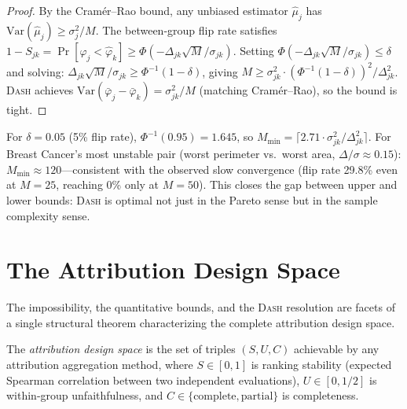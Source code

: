 \documentclass{jmlr}
\newcommand{\Var}{\mathrm{Var}}
\newcommand{\DASH}{\textsc{Dash}}
\begin{document}
\begin{proof}
By the Cram\'er--Rao bound, any unbiased estimator $\hat\mu_j$ has $\Var(\hat\mu_j) \geq \sigma_j^2/M$. The between-group flip rate satisfies $1 - S_{jk} = \Pr[\hat\varphi_j < \hat\varphi_k] \geq \Phi(-\Delta_{jk}\sqrt{M}/\sigma_{jk})$. Setting $\Phi(-\Delta_{jk}\sqrt{M}/\sigma_{jk}) \leq \delta$ and solving: $\Delta_{jk}\sqrt{M}/\sigma_{jk} \geq \Phi^{-1}(1-\delta)$, giving $M \geq \sigma_{jk}^2 \cdot (\Phi^{-1}(1-\delta))^2/\Delta_{jk}^2$. \DASH{} achieves $\Var(\bar\varphi_j - \bar\varphi_k) = \sigma_{jk}^2/M$ (matching Cram\'er--Rao), so the bound is tight.
\end{proof}

For $\delta = 0.05$ (5\% flip rate), $\Phi^{-1}(0.95) = 1.645$, so $M_{\min} = \lceil 2.71 \cdot \sigma_{jk}^2/\Delta_{jk}^2 \rceil$. For Breast Cancer's most unstable pair (worst perimeter vs.\ worst area, $\Delta/\sigma \approx 0.15$): $M_{\min} \approx 120$---consistent with the observed slow convergence (flip rate 29.8\% even at $M = 25$, reaching 0\% only at $M = 50$). This closes the gap between upper and lower bounds: \DASH{} is optimal not just in the Pareto sense but in the sample complexity sense.


\section{The Attribution Design Space}
\label{sec:design-space}

The impossibility, the quantitative bounds, and the \DASH{} resolution are facets of a single structural theorem characterizing the complete attribution design space.

\begin{definition}
\label{def:design-space-def}
The \emph{attribution design space} is the set of triples $(S, U, C)$ achievable by any attribution aggregation method, where $S \in [0,1]$ is ranking stability (expected Spearman correlation between two independent evaluations), $U \in [0, 1/2]$ is within-group unfaithfulness, and $C \in \{\text{complete}, \text{partial}\}$ is completeness.
\end{definition}
\end{document}
